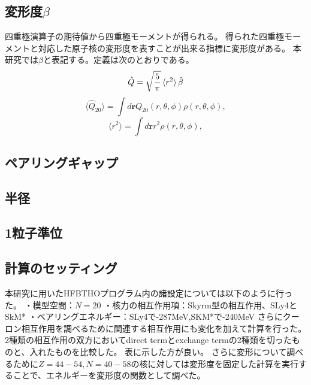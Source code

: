 \documentclass[12pt]{jarticle}
\begin{document}
\subsection{変形度$\beta$}
四重極演算子の期待値から四重極モーメントが得られる。
得られた四重極モーメントと対応した原子核の変形度を表すことが出来る指標に変形度がある。
本研究では$\beta$と表記する。定義は次のとおりである。
\begin{equation}
    \label{beta-func}
    \hat{Q} = \sqrt{\frac{5}{\pi}}\ev*{r^2}\hat{\beta}
\end{equation}
\begin{equation}
    \langle \hat{Q}_{20}\rangle = \int d\boldsymbol{r} Q_{20}(r,\theta,\phi) \rho(r,\theta,\phi),
\end{equation}
\begin{equation}
    \langle r^2 \rangle = \int d\boldsymbol{r}  r^2 \rho(r,\theta,\phi),
\end{equation}

\subsection{ペアリングギャップ}
\subsection{半径}
\subsection{1粒子準位}

\subsection{計算のセッティング}
本研究に用いたHFBTHOプログラム内の諸設定については以下のように行った。
・模型空間：$N=20$
・核力の相互作用項：Skyrm型の相互作用、SLy4とSkM*
・ペアリングエネルギー：SLy4で-287MeV,SKM*で-240MeV
さらにクーロン相互作用を調べるために関連する相互作用にも変化を加えて計算を行った。
2種類の相互作用の双方においてdirect termとexchange termの2種類を切ったものと、入れたものを比較した。
表に示した方が良い。
さらに変形について調べるために$Z=44-54,N=40-58$の核に対しては変形度を固定した計算を実行することで、エネルギーを変形度の関数として調べた。
\end{document}
